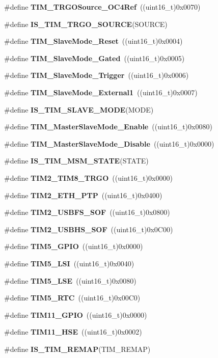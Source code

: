 \begin{DoxyCompactItemize}
\#define \textbf{ T\+I\+M\+\_\+\+T\+R\+G\+O\+Source\+\_\+\+O\+C4\+Ref}~((uint16\+\_\+t)0x0070)
\item 
\#define \textbf{ I\+S\+\_\+\+T\+I\+M\+\_\+\+T\+R\+G\+O\+\_\+\+S\+O\+U\+R\+CE}(S\+O\+U\+R\+CE)
\item 
\#define \textbf{ T\+I\+M\+\_\+\+Slave\+Mode\+\_\+\+Reset}~((uint16\+\_\+t)0x0004)
\item 
\#define \textbf{ T\+I\+M\+\_\+\+Slave\+Mode\+\_\+\+Gated}~((uint16\+\_\+t)0x0005)
\item 
\#define \textbf{ T\+I\+M\+\_\+\+Slave\+Mode\+\_\+\+Trigger}~((uint16\+\_\+t)0x0006)
\item 
\#define \textbf{ T\+I\+M\+\_\+\+Slave\+Mode\+\_\+\+External1}~((uint16\+\_\+t)0x0007)
\item 
\#define \textbf{ I\+S\+\_\+\+T\+I\+M\+\_\+\+S\+L\+A\+V\+E\+\_\+\+M\+O\+DE}(M\+O\+DE)
\item 
\#define \textbf{ T\+I\+M\+\_\+\+Master\+Slave\+Mode\+\_\+\+Enable}~((uint16\+\_\+t)0x0080)
\item 
\#define \textbf{ T\+I\+M\+\_\+\+Master\+Slave\+Mode\+\_\+\+Disable}~((uint16\+\_\+t)0x0000)
\item 
\#define \textbf{ I\+S\+\_\+\+T\+I\+M\+\_\+\+M\+S\+M\+\_\+\+S\+T\+A\+TE}(S\+T\+A\+TE)
\item 
\#define \textbf{ T\+I\+M2\+\_\+\+T\+I\+M8\+\_\+\+T\+R\+GO}~((uint16\+\_\+t)0x0000)
\item 
\#define \textbf{ T\+I\+M2\+\_\+\+E\+T\+H\+\_\+\+P\+TP}~((uint16\+\_\+t)0x0400)
\item 
\#define \textbf{ T\+I\+M2\+\_\+\+U\+S\+B\+F\+S\+\_\+\+S\+OF}~((uint16\+\_\+t)0x0800)
\item 
\#define \textbf{ T\+I\+M2\+\_\+\+U\+S\+B\+H\+S\+\_\+\+S\+OF}~((uint16\+\_\+t)0x0\+C00)
\item 
\#define \textbf{ T\+I\+M5\+\_\+\+G\+P\+IO}~((uint16\+\_\+t)0x0000)
\item 
\#define \textbf{ T\+I\+M5\+\_\+\+L\+SI}~((uint16\+\_\+t)0x0040)
\item 
\#define \textbf{ T\+I\+M5\+\_\+\+L\+SE}~((uint16\+\_\+t)0x0080)
\item 
\#define \textbf{ T\+I\+M5\+\_\+\+R\+TC}~((uint16\+\_\+t)0x00\+C0)
\item 
\#define \textbf{ T\+I\+M11\+\_\+\+G\+P\+IO}~((uint16\+\_\+t)0x0000)
\item 
\#define \textbf{ T\+I\+M11\+\_\+\+H\+SE}~((uint16\+\_\+t)0x0002)
\item 
\#define \textbf{ I\+S\+\_\+\+T\+I\+M\+\_\+\+R\+E\+M\+AP}(T\+I\+M\+\_\+\+R\+E\+M\+AP)

\end{DoxyCompactItemize}
